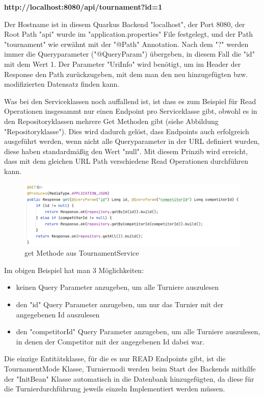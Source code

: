 \textbf{http://localhost:8080/api/tournament?id=1} 

Der Hostname ist in diesem Quarkus Backend "localhost", der Port 8080, der Root Path "api" wurde im "application.properties" File festgelegt, und der Path "tournament" wie erwähnt mit der "@Path" Annotation. 
Nach dem "?" werden immer die Queryparameter ("@QueryParam") übergeben, in diesem Fall die "id" mit dem Wert 1. Der Parameter "UriInfo" wird benötigt, um im Header der Response den Path zurückzugeben, 
mit dem man den neu hinzugefügten bzw. modifizierten Datensatz finden kann.

Was bei den Serviceklassen noch auffallend ist, ist dass es zum Beispiel für Read Operationen insgesammt nur einen Endpoint pro Serviceklasse gibt, obwohl es in den Repositoryklassen mehrere Get Methoden gibt (siehe Abbildung "Repositoryklasse").
Dies wird dadurch gelöst, dass Endpoints auch erfolgreich ausgeführt werden, wenn nicht alle Queryparameter in der URL definiert wurden, diese haben standardmäßig den Wert "null". Mit diesem Prinzib wird erreicht, dass mit dem gleichen URL Path 
verschiedene Read Operationen durchführen kann.

\begin{figure}[H]
    \includegraphics[scale=0.5]{pics/service_get_function.png}
    \caption{get Methode aus TournamentService}
\end{figure}

Im obigen Beispiel hat man 3 Möglichkeiten:

\begin{itemize}
    \item keinen Query Parameter anzugeben, um alle Turniere auszulesen
    \item den "id" Query Parameter anzugeben, um nur das Turnier mit der angegebenen Id auszulesen
    \item den "competitorId" Query Parameter anzugeben, um alle Turniere auszulesen, in denen der Competitor mit der angegebenen Id dabei war.
\end{itemize}

Die einzige Entitätsklasse, für die es nur READ Endpoints gibt, ist die TournamentMode Klasse, Turniermodi werden beim Start des Backends mithilfe der "InitBean" Klasse 
automatisch in die Datenbank hinzugefügten, da diese für die Turnierdurchführung jeweils einzeln Implementiert werden müssen.

